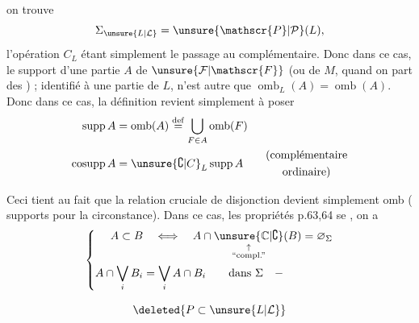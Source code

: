 
on trouve
\[
\Sigma_{\unsure{L|\mathcal{L}}}=\unsure{\mathscr{P}|\mathcal{P}}(L),
\]
l'opération $C_L$ étant simplement le passage au complémentaire. Donc dans ce cas, le support d'une partie $A$ de $\unsure{\mathcal{F}|\mathscr{F}}$ (ou de $M$, quand on part des ) ; identifié à une partie de $L$, n'est autre que $\operatorname{omb}_L(A)=\operatorname{omb}(A)$. Donc dans ce cas, la définition revient simplement à poser
\[
\begin{aligned}
\operatorname{supp}A&=\operatorname{omb}(A)\overset{\mathrm{def}}{=}\bigcup_{F\in A}\operatorname{omb}(F)\\
\operatorname{cosupp}A&=\unsure{\complement|C}_L\operatorname{supp}A
\qquad\begin{gathered}\text{(complémentaire}\\\text{ordinaire)}\end{gathered}
\end{aligned}
\]

Ceci tient au fait que la relation cruciale de disjonction devient simplement
omb ( supports pour la circonstance). Dans ce cas, les propriétés p.63,64 se , on a
\[
\left\{\begin{aligned}
A\subset B&\quad\Longleftrightarrow\quad A\cap\underset{\substack{\uparrow\\\text{``compl.''}}}{\unsure{\mathbb{C}|\complement}}(B)=\varnothing_\Sigma\\
A\cap\bigvee_i B_i&=\bigvee_i A\cap B_i\qquad\text{dans }\Sigma\quad-
\end{aligned}\right.
\]


\[
\deleted{P\subset\unsure{L|\mathcal{L}}}
\]

